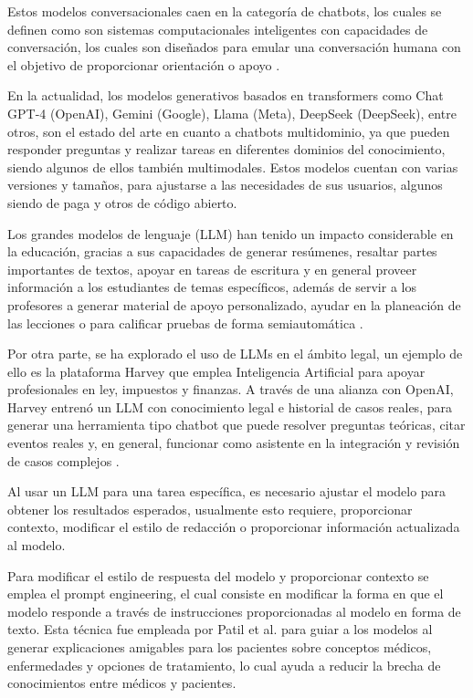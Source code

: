 Estos modelos conversacionales caen en la categoría de chatbots, los cuales se
definen como son sistemas computacionales inteligentes con capacidades de conversación,
los cuales son diseñados para emular una conversación humana con el objetivo de
proporcionar orientación o apoyo \cite{caldarini_literature_2022}.

En la actualidad, los modelos generativos basados en transformers como Chat GPT-4
(OpenAI), Gemini (Google), Llama (Meta), DeepSeek (DeepSeek), entre otros, son el
estado del arte en cuanto a chatbots multidominio, ya que pueden responder preguntas
y realizar tareas en diferentes dominios del conocimiento, siendo algunos de ellos
también multimodales. Estos modelos cuentan con varias versiones y tamaños, para
ajustarse a las necesidades de sus usuarios, algunos siendo de paga y otros de
código abierto.

Los grandes modelos de lenguaje (LLM) han tenido un impacto considerable en la
educación, gracias a sus capacidades de generar resúmenes, resaltar partes
importantes de textos, apoyar en tareas de escritura y en general proveer información
a los estudiantes de temas específicos, además de servir a los profesores a generar
material de apoyo personalizado, ayudar en la planeación de las lecciones o para
calificar pruebas de forma semiautomática \cite{kasneci_chatgpt_2023}.

Por otra parte, se ha explorado el uso de LLMs en el ámbito legal, un ejemplo de
ello es la plataforma Harvey que emplea Inteligencia Artificial para apoyar
profesionales en ley, impuestos y finanzas. A través de una alianza con OpenAI,
Harvey entrenó un LLM con conocimiento legal e historial de casos reales, para
generar una herramienta tipo chatbot que puede resolver preguntas teóricas, citar
eventos reales y, en general, funcionar como asistente en la integración y revisión
de casos complejos \cite{openai_customizing_2024}.

Al usar un LLM para una tarea específica, es necesario ajustar el modelo para
obtener los resultados esperados, usualmente esto requiere, proporcionar contexto,
modificar el estilo de redacción o proporcionar información actualizada al modelo.

Para modificar el estilo de respuesta del modelo y proporcionar contexto se
emplea el prompt engineering, el cual consiste en modificar la forma en que el
modelo responde a través de instrucciones proporcionadas al modelo en forma de
texto. Esta técnica fue empleada por Patil et al. \cite{patil_prompt_2024} para
guiar a los modelos al generar explicaciones amigables para los pacientes sobre
conceptos médicos, enfermedades y opciones de tratamiento, lo cual ayuda a reducir
la brecha de conocimientos entre médicos y pacientes.

